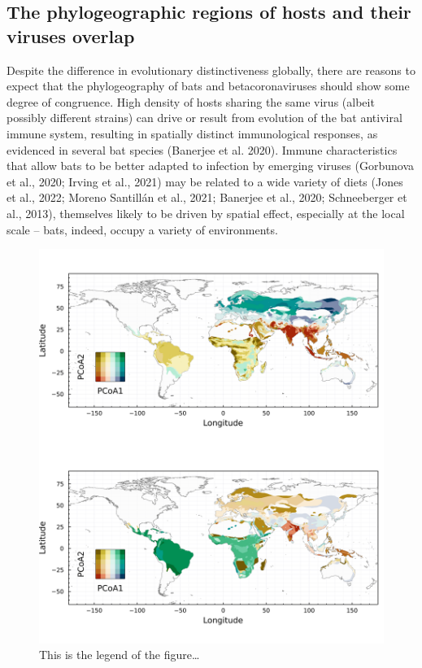 \documentclass[11pt]{article}
\makeatletter
\def\maxwidth{\ifdim\Gin@nat@width>\linewidth\linewidth
\else\Gin@nat@width\fi}
\let\Oldincludegraphics\includegraphics
\renewcommand{\includegraphics}[1]{\Oldincludegraphics[width=\maxwidth]{#1}}
\makeatother
\begin{document}
\hypertarget{the-phylogeographic-regions-of-hosts-and-their-viruses-overlap}{%
\subsection{The phylogeographic regions of hosts and their viruses
overlap}\label{the-phylogeographic-regions-of-hosts-and-their-viruses-overlap}}

Despite the difference in evolutionary distinctiveness globally, there
are reasons to expect that the phylogeography of bats and
betacoronaviruses should show some degree of congruence. High density of
hosts sharing the same virus (albeit possibly different strains) can
drive or result from evolution of the bat antiviral immune system,
resulting in spatially distinct immunological responses, as evidenced in
several bat species (Banerjee et al. 2020). Immune characteristics that
allow bats to be better adapted to infection by emerging viruses
(Gorbunova et al., 2020; Irving et al., 2021) may be related to a wide
variety of diets (Jones et al., 2022; Moreno Santillán et al., 2021;
Banerjee et al., 2020; Schneeberger et al., 2013), themselves likely to
be driven by spatial effect, especially at the local scale -- bats,
indeed, occupy a variety of environments.

\begin{figure}
\hypertarget{fig:biogeo}{%
\centering
\includegraphics{figures/combined_biogeo.png}
\caption{This is the legend of the figure\ldots{}}\label{fig:biogeo}
}
\end{figure}
\end{document}
